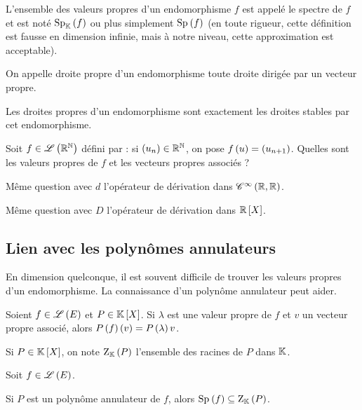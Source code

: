 L'ensemble des valeurs propres d'un endomorphisme \(f\) est appelé le spectre de \(f\) et est noté \(\Sp[\K]{f}\) ou plus simplement \(\Sp{f}\) (en toute rigueur, cette définition est fausse en dimension infinie, mais à notre niveau, cette approximation est acceptable).

\begin{defi}
On appelle droite propre d'un endomorphisme toute droite dirigée par un vecteur propre.
\end{defi}

\begin{prop}
Les droites propres d'un endomorphisme sont exactement les droites stables par cet endomorphisme.
\end{prop}

\begin{exo}
Soit \(f\in\mathscr{L}\left(\mathbb{R}^{\mathbb{N}}\right)\) défini par : si \(\left(u_n\right)\in\mathbb{R}^{\mathbb{N}}\), on pose \(f\left(u\right)=\left(u_{n+1}\right)\). Quelles sont les valeurs propres de \(f\) et les vecteurs propres associés ?
\end{exo}

\begin{exo}
Même question avec \(d\) l'opérateur de dérivation dans \(\mathscr{C}^{\infty}\left(\mathbb{R},\mathbb{R}\right)\).
\end{exo}

\begin{exo}
Même question avec \(D\) l'opérateur de dérivation dans \(\poly[\R]\).
\end{exo}

\subsection{Lien avec les polynômes annulateurs}

En dimension quelconque, il est souvent difficile de trouver les valeurs propres d'un endomorphisme. La connaissance d'un polynôme annulateur peut aider.

\begin{lem}
Soient \(f\in\mathscr{L}\left(E\right)\) et \(P\in\poly\). Si \(\lambda\) est une valeur propre de \(f\) et \(v\) un vecteur propre associé, alors \(P\left(f\right)\left(v\right)=P\left(\lambda\right)v\).
\end{lem}

Si \(P\in\poly\), on note \(\rac{P}\) l'ensemble des racines de \(P\) dans \(\mathbb{K}\).

\begin{prop}
Soit \(f\in\mathscr{L}\left(E\right)\).

Si \(P\) est un polynôme annulateur de \(f\), alors \(\Sp{f}\subset\rac{P}\).
\end{prop}

